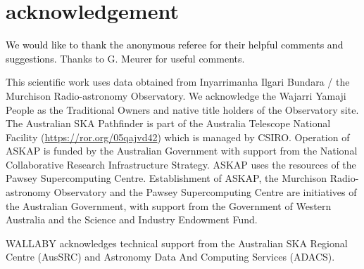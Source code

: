 \documentclass[fleqn,usenatbib]{mnras}
\begin{document}

\section*{acknowledgement}

\textcolor{black}{We would like to thank the anonymous referee for their helpful comments and suggestions.}
Thanks to G. Meurer for useful comments. 

This scientific work uses data obtained from Inyarrimanha Ilgari Bundara / the Murchison Radio-astronomy Observatory. We acknowledge the Wajarri Yamaji People as the Traditional Owners and native title holders of the Observatory site. The Australian SKA Pathfinder is part of the Australia Telescope National Facility (\href{https://ror.org/05qajvd42}{https://ror.org/05qajvd42}) which is managed by CSIRO. Operation of ASKAP is funded by the Australian Government with support from the National Collaborative Research Infrastructure Strategy. ASKAP uses the resources of the Pawsey Supercomputing Centre. Establishment of ASKAP, the Murchison Radio-astronomy Observatory and the Pawsey Supercomputing Centre are initiatives of the Australian Government, with support from the Government of Western Australia and the Science and Industry Endowment Fund.

    
WALLABY acknowledges technical support from the Australian SKA Regional Centre (AusSRC) and Astronomy Data And Computing Services (ADACS).
\end{document}

